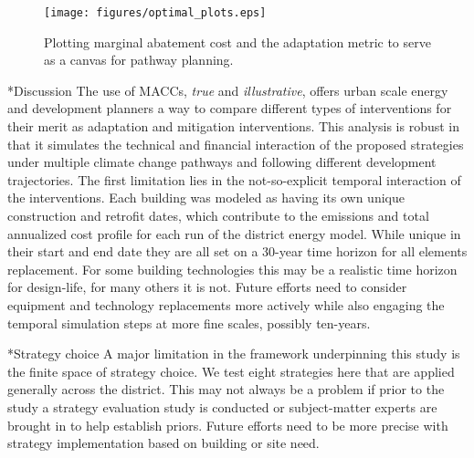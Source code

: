 \documentclass[twocolumn, a4paper,10pt]{article}
\makeatletter
\renewcommand\section{\@startsection{section}{1}{\z@}{3pt}{3pt}{\normalfont\large\bfseries}}
\renewcommand\subsection{\@startsection{subsection}{1}{\z@}{\z@}{\z@}{\normalfont\normalsize\bfseries}}
\renewcommand\subsection{\@startsection{subsection}{1}{\z@}{\z@}{0.1pt}{\normalfont\normalsize\bfseries}}
\makeatother
\begin{document}
\begin{figure}[hbpt]
    \centering
    \texttt{[image: figures/optimal\_plots.eps]}
    \caption{Plotting marginal abatement cost and the adaptation metric to serve as a canvas for pathway planning.}
    \label{fig:pareto_plot}
\end{figure}

\section*{Discussion}
The use of MACCs, \textit{true} and \textit{illustrative}, offers urban scale energy and development planners a way to compare different types of interventions for their merit as adaptation and mitigation interventions. This analysis is robust in that it simulates the technical and financial interaction of the proposed strategies under multiple climate change pathways and following different development trajectories. The first limitation lies in the not-so-explicit temporal interaction of the interventions. Each building was modeled as having its own unique construction and retrofit dates, which contribute to the emissions and total annualized cost profile for each run of the district energy model. While unique in their start and end date they are all set on a 30-year time horizon for all elements replacement. For some building technologies this may be a realistic time horizon for design-life, for many others it is not. Future efforts need to consider equipment and technology replacements more actively while also engaging the temporal simulation steps at more fine scales, possibly ten-years. 


\subsection*{Strategy choice}
A major limitation in the framework underpinning this study is the finite space of strategy choice. We test eight strategies here that are applied generally across the district. This may not always be a problem if prior to the study a strategy evaluation study is conducted or subject-matter experts are brought in to help establish priors. Future efforts need to be more precise with strategy implementation based on building or site need. 
\end{document}
